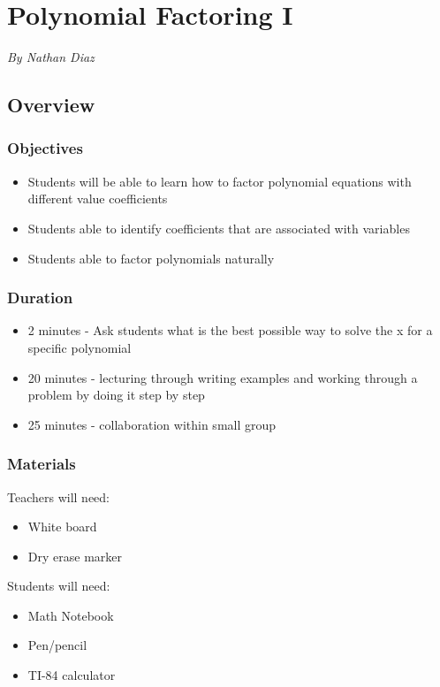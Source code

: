 \chapter{Polynomial Factoring I}

\emph{By Nathan Diaz}

\section{Overview}

\subsection{Objectives}

\begin{itemize}
    \item Students will be able to learn how to factor polynomial equations with different value coefficients
    \item Students able to identify coefficients that are associated with variables  
    \item Students able to factor polynomials naturally
\end{itemize}

\subsection{Duration}

\begin{itemize}
    \item 2 minutes - Ask students what is the best possible way to solve the x for a specific polynomial 
    \item 20 minutes - lecturing through writing examples and working through a problem by doing it step by step
    \item 25 minutes - collaboration within small group 
\end{itemize}

\subsection{Materials}

Teachers will need:
\begin{itemize}
    \item White board 
    \item Dry erase marker 
\end{itemize}

Students will need:
\begin{itemize}
    \item Math Notebook
    \item Pen/pencil
    \item TI-84 calculator
\end{itemize}

